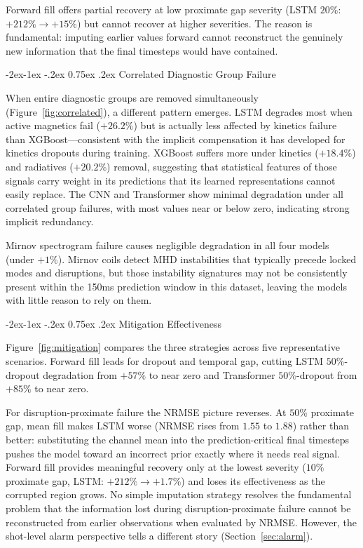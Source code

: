 \documentclass[10pt,twocolumn]{article}
\makeatletter
\renewcommand\subsection{\@startsection{subsection}{2}{\z@}%
  {-2ex\@plus -1ex \@minus -.2ex}%
  {0.75ex \@plus .2ex}%
  {\normalfont\large\bfseries}}
\makeatother
\begin{document}
Forward fill offers partial recovery at low proximate gap severity (LSTM
$20\%$: $+212\% \to +15\%$) but cannot recover at higher severities.
The reason is fundamental: imputing earlier values forward cannot
reconstruct the genuinely new information that the final timesteps would
have contained.

\subsection{Correlated Diagnostic Group Failure}

When entire diagnostic groups are removed simultaneously
(Figure~\ref{fig:correlated}), a different pattern emerges. LSTM
degrades most when active magnetics fail ($+26.2\%$) but is actually
less affected by kinetics failure than XGBoost—consistent with the
implicit compensation it has developed for kinetics dropouts during
training. XGBoost suffers more under kinetics ($+18.4\%$) and
radiatives ($+20.2\%$) removal, suggesting that statistical features
of those signals carry weight in its predictions that its learned
representations cannot easily replace. The CNN and Transformer show
minimal degradation under all correlated group failures, with most
values near or below zero, indicating strong implicit redundancy.

Mirnov spectrogram failure causes negligible degradation in all four
models (under $+1\%$). Mirnov coils detect MHD instabilities that
typically precede locked modes and disruptions, but those instability
signatures may not be consistently present within the 150ms prediction
window in this dataset, leaving the models with little reason to rely
on them.

\subsection{Mitigation Effectiveness}

Figure~\ref{fig:mitigation} compares the three strategies across five
representative scenarios. Forward fill leads for dropout and temporal
gap, cutting LSTM $50\%$-dropout degradation from $+57\%$ to near zero
and Transformer $50\%$-dropout from $+85\%$ to near zero.

For disruption-proximate failure the NRMSE picture reverses. At $50\%$
proximate gap, mean fill makes LSTM worse (NRMSE rises from $1.55$ to
$1.88$) rather than better: substituting the channel mean into the
prediction-critical final timesteps pushes the model toward an
incorrect prior exactly where it needs real signal. Forward fill
provides meaningful recovery only at the lowest severity ($10\%$
proximate gap, LSTM: $+212\% \to +1.7\%$) and loses its effectiveness
as the corrupted region grows. No simple imputation strategy resolves
the fundamental problem that the information lost during
disruption-proximate failure cannot be reconstructed from earlier
observations when evaluated by NRMSE. However, the shot-level alarm
perspective tells a different story (Section~\ref{sec:alarm}).
\end{document}
